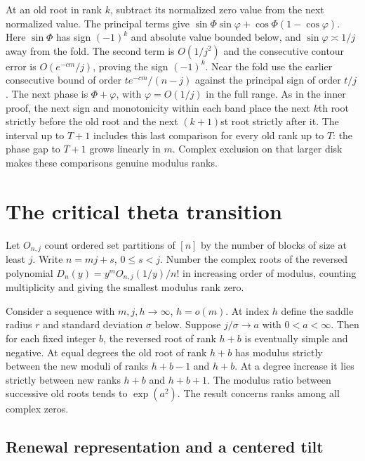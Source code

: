 \documentclass[11pt]{article}
\begin{document}
At an old root in rank \(k\), subtract its normalized zero value from the next normalized value. The principal terms give \(\sin\Phi\sin\varphi+\cos\Phi(1-\cos\varphi)\). Here \(\sin\Phi\) has sign \((-1)^k\) and absolute value bounded below, and \(\sin\varphi\asymp1/j\) away from the fold. The second term is \(O(1/j^2)\) and the consecutive contour error is \(O(e^{-c m}/j)\), proving the sign \((-1)^k\). Near the fold use the earlier consecutive bound of order \(t e^{-c m}/(n-j)\) against the principal sign of order \(t/j\). The next phase is \(\Phi+\varphi\), with \(\varphi=O(1/j)\) in the full range. As in the inner proof, the next sign and monotonicity within each band place the next \(k\)th root strictly before the old root and the next \((k+1)\)st root strictly after it. The interval up to \(T+1\) includes this last comparison for every old rank up to \(T\): the phase gap to \(T+1\) grows linearly in \(m\). Complex exclusion on that larger disk makes these comparisons genuine modulus ranks.

\section{The critical theta transition}
\label{sec:theta}

Let \(O_{n,j}\) count ordered set partitions of \([n]\) by the number of blocks of size at least \(j\). Write \(n=mj+s\), \(0\le s<j\). Number the complex roots of the reversed polynomial \(D_n(y)=y^m O_{n,j}(1/y)/n!\) in increasing order of modulus, counting multiplicity and giving the smallest modulus rank zero.

Consider a sequence with \(m,j,h\to\infty\), \(h=o(m)\). At index \(h\) define the saddle radius \(r\) and standard deviation \(\sigma\) below. Suppose \(j/\sigma\to a\) with \(0<a<\infty\). Then for each fixed integer \(b\), the reversed root of rank \(h+b\) is eventually simple and negative. At equal degrees the old root of rank \(h+b\) has modulus strictly between the new moduli of ranks \(h+b-1\) and \(h+b\). At a degree increase it lies strictly between new ranks \(h+b\) and \(h+b+1\). The modulus ratio between successive old roots tends to \(\exp(a^2)\). The result concerns ranks among all complex zeros.

\subsection{Renewal representation and a centered tilt}
\label{sec:renewal-representation-and-a-centered-tilt}
\end{document}
